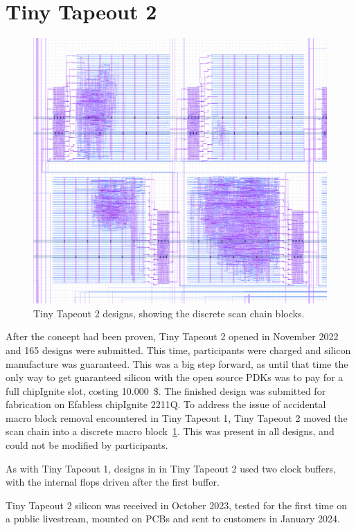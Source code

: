 \section{Tiny Tapeout 2}
\label{sec:tinytapeout2}

\begin{figure}[!t]
\centering
\includegraphics[width=\columnwidth]{./Figs/tt02_gds_zoom.png}
\caption{Tiny Tapeout 2 designs, showing the discrete scan chain blocks.}
\label{fig:TT02_separate_scan_blocks}
\end{figure}

After the concept had been proven, Tiny Tapeout 2 opened in November 2022 and 165 designs were submitted. This time, participants were charged and silicon manufacture was guaranteed. This was a big step forward, as until that time the only way to get guaranteed silicon with the open source PDKs was to pay for a full chipIgnite slot, costing \qty{10,000}{\$}. The finished design was submitted for fabrication on Efabless chipIgnite 2211Q.
To address the issue of accidental macro block removal encountered in Tiny Tapeout 1, Tiny Tapeout 2 moved the scan chain into a discrete macro block~\ref{fig:TT02_separate_scan_blocks}. This was present in all designs, and could not be modified by participants.

As with Tiny Tapeout 1, designs in in Tiny Tapeout 2 used two clock buffers, with the internal flops driven after the first buffer.

Tiny Tapeout 2 silicon was received in October 2023, tested for the first time on a public livestream, mounted on PCBs and sent to customers in January 2024.

